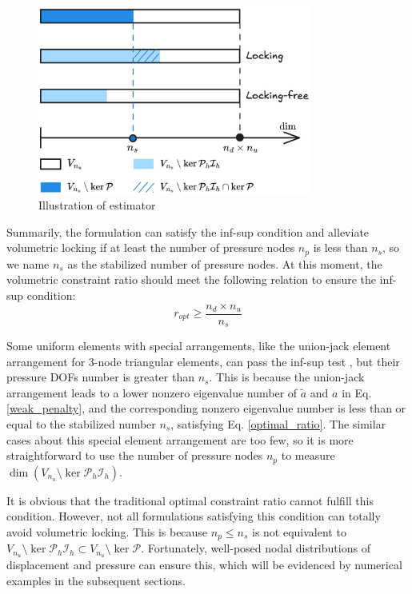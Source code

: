 \begin{figure}[!ht]
\centering
\includegraphics[width=0.8\textwidth]{space.png}
\caption{Illustration of estimator}\label{fg:space}
\end{figure}

Summarily, the formulation can satisfy the inf-sup condition and alleviate volumetric locking if at least the number of pressure nodes $n_p$ is less than $n_s$, so we name $n_s$ as the stabilized number of pressure nodes. At this moment, the volumetric constraint ratio should meet the following relation to ensure the inf-sup condition:
\begin{equation}\label{optimal_ratio}
r_{opt} \ge \frac{n_d \times n_u}{n_s}
\end{equation}

\begin{rmk}
Some uniform elements with special arrangements, like the union-jack element arrangement for 3-node triangular elements, can pass the inf-sup test \cite{chapelle1993}, but their pressure DOFs number is greater than $n_s$. This is because the union-jack arrangement leads to a lower nonzero eigenvalue number of $\tilde{a}$ and $a$ in Eq. \eqref{weak_penalty}, and the corresponding nonzero eigenvalue number is less than or equal to the stabilized number $n_s$, satisfying Eq. \eqref{optimal_ratio}. The similar cases about this special element arrangement are too few, so it is more straightforward to use the number of pressure nodes $n_p$ to measure $\dim (V_{n_u} \setminus \ker \mathcal{P}_h \mathcal{I}_h)$.
\end{rmk}

\begin{rmk}
It is obvious that the traditional optimal constraint ratio cannot fulfill this condition. However, not all formulations satisfying this condition can totally avoid volumetric locking. This is because $n_p \le n_s$ is not equivalent to $V_{n_u} \setminus \ker \mathcal{P}_h \mathcal{I}_h \subset V_{n_u} \setminus \ker \mathcal{P}$. Fortunately, well-posed nodal distributions of displacement and pressure can ensure this, which will be evidenced by numerical examples in the subsequent sections.
\end{rmk}

